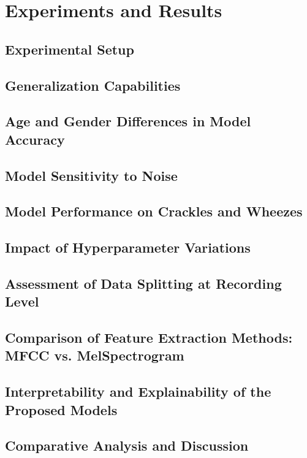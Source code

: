 \cleardoubleoddpage%
\chapter{Experiments and Results}

\section{Experimental Setup}
\section{Generalization Capabilities}
\section{Age and Gender Differences in Model Accuracy}
\section{Model Sensitivity to Noise}
\section{Model Performance on Crackles and Wheezes}
\section{Impact of Hyperparameter Variations}
\section{Assessment of Data Splitting at Recording Level}
\section{Comparison of Feature Extraction Methods: MFCC vs. MelSpectrogram}
\section{Interpretability and Explainability of the Proposed Models}
\section{Comparative Analysis and Discussion}

